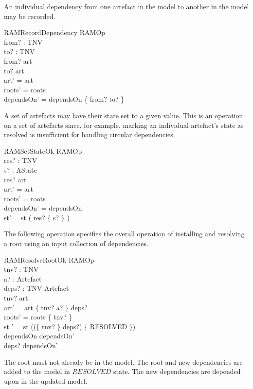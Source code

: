 \documentclass[a4paper,12pt]{article}
\begin{document}
An individual dependency from one artefact in the model to another in the model may be recorded.
\begin{schema}{RAMRecordDependency}
RAMOp \\
from? : TNV \\
to? : TNV \\
\where
from? \in \dom art \\
to? \in \dom art \\
art' = art \\
roots' = roots \\
dependsOn' = dependsOn \cup \{ from? \mapsto to? \} \\
\end{schema}

A set of artefacts may have their state set to a given value.
This is an operation on a set of artefacts since, for example, marking an individual artefact's state as
resolved is insufficient for handling circular dependencies.
\begin{schema}{RAMSetStateOk}
RAMOp \\
res? : \power TNV \\
s? : AState \\
\where
res? \subseteq \dom art \\
art' = art \\
roots' = roots \\
dependsOn' = dependsOn \\
st' = st \oplus ( res? \cross \{ s? \} ) \\
\end{schema}

The following operation specifies the overall operation of installing and resolving a root
using an input collection of dependencies.
\begin{schema}{RAMResolveRootOk}
RAMOp \\
tnv? : TNV \\
a? : Artefact \\
deps? : TNV \pinj Artefact \\
\where
tnv? \notin \dom art \\
\also
art' = art \cup \{ tnv? \mapsto a? \} \cup deps? \\
roots' = roots \cup \{ tnv? \} \\
st ' = st \cup ((\{ tnv? \} \cup \dom deps?) \cross \{ RESOLVED \}) \\
\also
dependsOn \subseteq dependsOn' \\
\dom deps? \subseteq \ran dependsOn' \\
\end{schema}
The root must not already be in the model.
The root and new dependencies are added to the model in $RESOLVED$ state.
The new dependencies are depended upon in the updated model.
\end{document}
